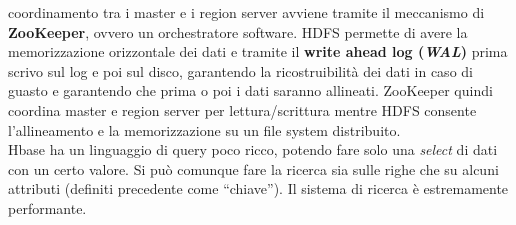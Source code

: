 \documentclass[a4paper,12pt, oneside]{book}
\begin{document}
coordinamento tra i master e i region server avviene tramite il meccanismo di
\textbf{ZooKeeper}, ovvero un orchestratore software. HDFS permette di avere la
memorizzazione orizzontale dei dati e tramite il \textbf{write ahead log
  (\textit{WAL})} prima scrivo sul log e poi sul disco, garantendo la
ricostruibilità dei dati in caso di guasto e garantendo che prima o poi i dati
saranno allineati. ZooKeeper quindi coordina master e region server per
lettura/scrittura mentre HDFS consente l'allineamento e la memorizzazione su un
file system distribuito.\\
Hbase ha un linguaggio di query poco ricco, potendo fare solo una
\textit{select} di dati con un certo valore. Si può comunque fare la ricerca sia
sulle righe che su alcuni attributi (definiti precedente come ``chiave''). Il
sistema di ricerca è estremamente performante.
\end{document}
